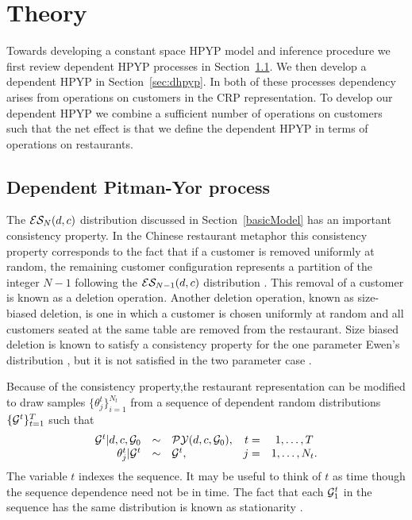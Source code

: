 \section{Theory}
\label{sec:theory}

Towards developing a constant space HPYP model and inference procedure we first review dependent HPYP processes in Section~\ref{sec:dpyp}.  We then develop a dependent HPYP in Section~\ref{sec:dhpyp}. In both of these processes dependency arises from operations on customers in the CRP representation. To develop our dependent HPYP we combine a sufficient number of operations on customers such that the net effect is that we define the dependent HPYP in terms of operations on restaurants.


\subsection{Dependent Pitman-Yor process} 
\label{sec:dpyp}

The $\ES_N(d,c)$ distribution discussed in Section~\ref{basicModel} has an important consistency property. In the Chinese restaurant metaphor this consistency property corresponds to the fact that if a customer is removed uniformly at random, the remaining customer configuration represents a partition of the integer $N-1$ following the $\ES_{N-1}(d,c)$ distribution \cite{Pitman1995}.  This removal of a customer is known as a deletion operation.  Another deletion operation, known as size-biased deletion, is one in which a customer is chosen uniformly at random and all customers seated at the same table are removed from the restaurant. Size biased deletion is known to satisfy a consistency property for the one parameter Ewen's distribution \cite{Kingman1978}, but it is not satisfied in the two parameter case \cite{Pitman1995}.

Because of the  consistency property,the restaurant representation can be modified to draw samples  $\{ \theta_j^t \}_{i = 1}^{N_t}$ from a sequence of dependent random distributions $\{ \G^t \}_{t=1}^T$ such that 
%
\begin{equation}
\begin{array}{rclrcr}
\G^t | d, c, \G_0 &\sim& \PY(d,c,\G_0),  & t =&1, \dots, T\\
 \label{eqnDependentPY2}  \theta_j^t | \G^t &\sim& \G^t, & j =&1, \dots ,N_t.
 \end{array}
 \end{equation}
The variable $t$ indexes the sequence.  It may be useful to think of $t$ as time though the sequence dependence need not be in time. The fact that each $\G^t_1$ in the sequence has the same distribution is known as stationarity \cite{Brockwell1991}.  
 
